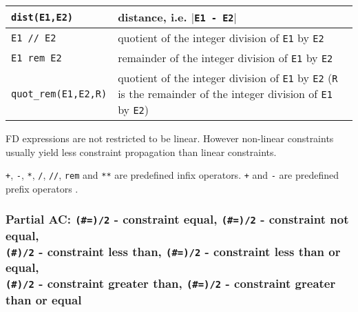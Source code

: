 \begin{tabular}{|l|L{10cm}|}
\texttt{dist(E1,E2)} & distance, i.e. $|$\texttt{E1 - E2$|$} \\

\hline

\texttt{E1 // E2} & quotient of the integer division of \texttt{E1} by
\texttt{E2} \\

\hline

\texttt{E1 rem E2} & remainder of the integer division of \texttt{E1} by
\texttt{E2} \\

\hline

\texttt{quot\_rem(E1,E2,R)} & quotient of the integer division of
\texttt{E1} by \texttt{E2}
  \linebreak
   (\texttt{R} is the remainder of the integer division of \texttt{E1} by
   \texttt{E2}) \\

\hline
\end{tabular}

FD expressions are not restricted to be linear. However non-linear
constraints usually yield less constraint propagation than linear
constraints.

\texttt{+}, \texttt{-}, \texttt{*}, \texttt{/}, \texttt{//}, \texttt{rem}
and \texttt{**} are predefined infix operators. \texttt{+} and \texttt{-}
are predefined prefix operators .

\begin{PlErrors}




\end{PlErrors}

\subsubsection{Partial AC: \texttt{(\#=)/2} - constraint equal,
               \texttt{(\#{\bs}=)/2} - constraint not equal, \\
               \texttt{(\#{\lt})/2} - constraint less than,
               \texttt{(\#={\lt})/2} - constraint less than or equal, \\
               \texttt{(\#{\gt})/2} - constraint greater than,
               \texttt{(\#{\gt}=)/2} - constraint greater than or equal}
\label{Partial-AC:-(:=)/2}


